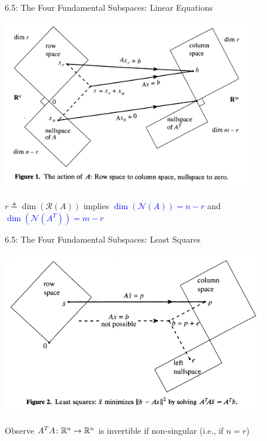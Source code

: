 \documentclass[10pt,letterpaper,english]{beamer}
\begin{document}
\begin{frame}{6.5: The Four Fundamental Subspaces: Linear Equations}

\hspace*{-1mm}
\includegraphics[width=108mm]{strang_fig1.png}

\vspace{-3mm}
$r \triangleq \dim(\mathcal{R}(A))$ implies \textcolor{blue}{$\dim ( \mathcal{N}(A)) = n\!-\!r$} and \textcolor{blue}{$\dim ( \mathcal{N}(A^T)) = m\!-\!r$}

\let\thefootnote\relax\footnotetext{\hspace*{-4mm} {\tiny Figure from ``The Fundamental Theorem of Linear Algebra'' by Gilbert Strang, The American Mathematical Monthly, Nov. 1993 }}

\end{frame}

\begin{frame}{6.5: The Four Fundamental Subspaces: Least Squares}

\hspace*{-4mm}
\includegraphics[width=114mm]{strang_fig2}

Observe $A^T A \colon \mathbb{R}^n \to \mathbb{R}^n$ is invertible if non-singular (i.e., if $n=r$)

\let\thefootnote\relax\footnotetext{\hspace*{-4mm} {\tiny Figure from ``The Fundamental Theorem of Linear Algebra'' by Gilbert Strang, The American Mathematical Monthly, Nov. 1993 }}

\end{frame}
\end{document}
